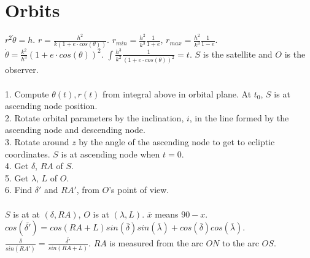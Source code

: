 \documentclass{report}
\begin{document}
\section{Orbits}
$r^2 \dot{\theta} =h$.
$r = {\frac {h^2}{k(1+e \cdot cos( \theta ))}}$.
$r_{min}= {\frac {h^2}{k^3}} {\frac {1} {1+e}}$,
$r_{max}= {\frac {h^2}{k^3}} {\frac {1} {1-e}}$.
$\dot{\theta} = {\frac {k^2}{h^3}} (1+ e \cdot cos(\theta ))^2$.
$\int {\frac {h^3}{k^2}} {\frac {1} {(1+e \cdot cos( \theta ))^2}}= t$.
$S$ is the satellite and $O$ is the observer.
\\
\\
1. Compute $\theta(t), r(t)$ from integral above in orbital plane.  At $t_0$,
$S$ is at ascending node position.
\\
2. Rotate orbital parameters by the inclination, $i$, in the line formed by the
ascending node and descending node.
\\
3. Rotate around $z$ by the angle of the ascending node to get to ecliptic coordinates.
$S$ is at ascending node when $t=0$.
\\
4. Get $\delta$, $RA$ of $S$.
\\
5. Get $\lambda$, $L$ of $O$.
\\
6. Find $\delta '$ and $RA '$, from $O$'s point of view.
\\
\\
$S$ is at at $( \delta , RA )$, $O$ is at $( \lambda , L)$. $\overline{x}$ means
$90-x$.
$cos ( \overline{ \delta ' }) =
cos( RA+L ) sin(\overline{\delta}) sin(\overline{\lambda}) +
cos(\overline{\delta}) cos(\overline{\lambda})$.
${\frac {\overline{\delta}} {sin(RA')}} =
{\frac {\overline{\delta'}} {sin(RA+L)}} $.  $RA$ is measured from the arc $ON$ to the arc
$OS$.
\end{document}
